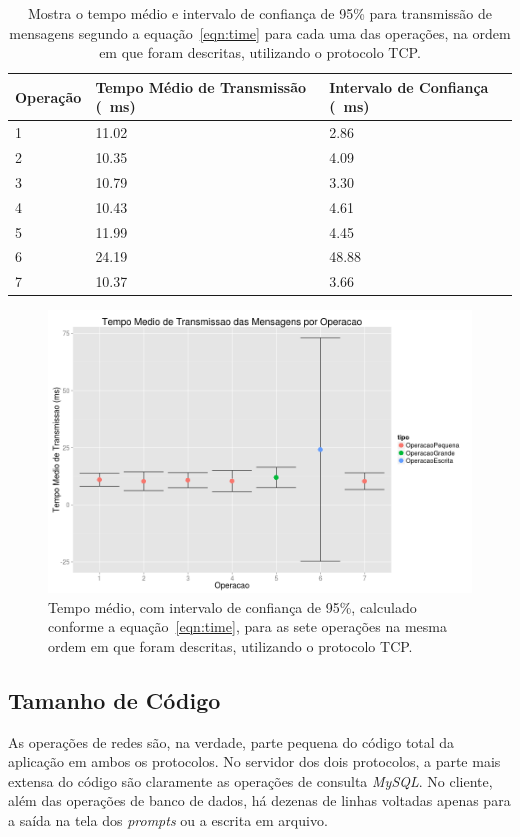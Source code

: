 \documentclass[12pt,a4paper]{article}
\begin{document}
\begin{table}[h]
\centering
\caption{Mostra o tempo médio e intervalo de confiança de 95\% para transmissão de mensagens segundo a equação~\ref{eqn:time} para cada uma das operações, na ordem em que foram descritas, utilizando o protocolo TCP.}
\label{table:transmissao}
\begin{tabular}{lll}
Operação & Tempo Médio de Transmissão (\SI{}{\milli\second}) & Intervalo de Confiança (\SI{}{\milli\second}) \\ \hline
1        & 11.02                & 2.86   \\
2        & 10.35                & 4.09   \\
3        & 10.79                & 3.30   \\
4        & 10.43                & 4.61   \\
5        & 11.99                & 4.45   \\
6        & 24.19                & 48.88  \\
7        & 10.37                & 3.66  
\end{tabular}
\end{table}

\begin{figure}[h]
\centering
\includegraphics[width=\textwidth]{diagrama/resultadosTempoTransmissao.png}
\caption{Tempo médio, com intervalo de confiança de 95\%, calculado conforme a equação~\ref{eqn:time}, para as sete operações na mesma ordem em que foram descritas, utilizando o protocolo TCP.}
\label{fig:transmissao}
\end{figure}

\subsection{Tamanho de Código}
As operações de redes são, na verdade, parte pequena do código total da aplicação em ambos os protocolos. No servidor dos dois protocolos, a parte mais extensa do código são claramente as operações de consulta {\it MySQL}. No cliente, além das operações de banco de dados, há dezenas de linhas voltadas apenas para a saída na tela dos {\it prompts} ou a escrita em arquivo.
\end{document}
